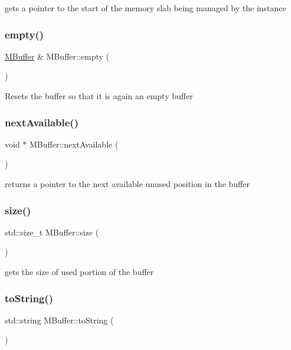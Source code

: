 gets a pointer to the start of the memory slab being managed by the instance \mbox{\label{struct_m_buffer_a6b1a469848174ab1925e964034408c07}} 
\subsubsection{\texorpdfstring{empty()}{empty()}}
{\footnotesize\ttfamily \hyperlink{struct_m_buffer}{M\+Buffer} \& M\+Buffer\+::empty (\begin{DoxyParamCaption}{ }\end{DoxyParamCaption})}

Resets the buffer so that it is again an empty buffer \mbox{\label{struct_m_buffer_a3a520754e8335f75136135caea741960}} 
\subsubsection{\texorpdfstring{next\+Available()}{nextAvailable()}}
{\footnotesize\ttfamily void $\ast$ M\+Buffer\+::next\+Available (\begin{DoxyParamCaption}{ }\end{DoxyParamCaption})}

returns a pointer to the next available unused position in the buffer \mbox{\label{struct_m_buffer_a9b3db2bdbcadcb68478cc5edc6164432}} 
\subsubsection{\texorpdfstring{size()}{size()}}
{\footnotesize\ttfamily std\+::size\+\_\+t M\+Buffer\+::size (\begin{DoxyParamCaption}{ }\end{DoxyParamCaption})}

gets the size of used portion of the buffer \mbox{\label{struct_m_buffer_af3600a4125123ee2b0e62fb84fd758a0}} 
\subsubsection{\texorpdfstring{to\+String()}{toString()}}
{\footnotesize\ttfamily std\+::string M\+Buffer\+::to\+String (\begin{DoxyParamCaption}{ }\end{DoxyParamCaption})}

